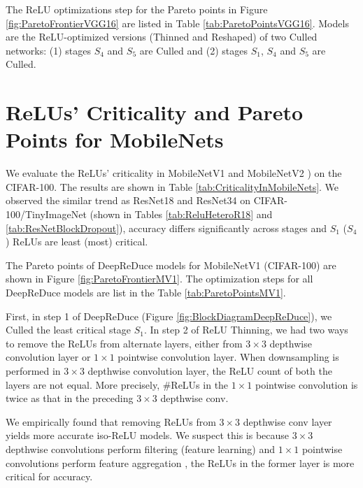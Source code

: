 

The ReLU optimizations step for the Pareto points in Figure \ref{fig:ParetoFrontierVGG16} are listed in Table \ref{tab:ParetoPointsVGG16}.  Models are the ReLU-optimized versions (Thinned and Reshaped) of two Culled networks: (1) stages $S_4$ and $S_5$ are Culled and (2) stages $S_1$, $S_4$ and $S_5$ are Culled. 





\section{ReLUs' Criticality and Pareto Points for MobileNets} \label{SecAppendix:ParetoPointsMV1}


We evaluate the ReLUs' criticality in MobileNetV1 \cite{howard2017mobilenets} and MobileNetV2 \cite{sandler2018mobilenetv2}) on the CIFAR-100. The results are shown in Table \ref{tab:CriticalityInMobileNets}.  We observed the similar trend as ResNet18 and ResNet34 on CIFAR-100/TinyImageNet (shown in Tables \ref{tab:ReluHeteroR18} and \ref{tab:ResNetBlockDropout}), accuracy differs significantly across stages and $S_1$ ($S_4$) ReLUs are least (most) critical.



The Pareto points of DeepReDuce models for MobileNetV1 (CIFAR-100) are shown in Figure \ref{fig:ParetoFrontierMV1}. The optimization steps for all DeepReDuce models are list in the Table \ref{tab:ParetoPointsMV1}. 


First, in step 1 of DeepReDuce (Figure \ref{fig:BlockDiagramDeepReDuce}), we Culled the least critical stage $S_1$. In step 2 of ReLU Thinning, we had two ways to remove the ReLUs from alternate layers, either from $3\times3$ depthwise convolution layer or $1\times1$ pointwise convolution layer. When downsampling is performed in $3\times3$ depthwise convolution layer, the ReLU count of both the layers are not equal. More precisely, \#ReLUs in the $1\times1$ pointwise convolution is twice as that in the preceding $3\times3$ depthwise conv. 


We empirically found that removing ReLUs from $3\times3$ depthwise conv layer yields more accurate iso-ReLU models. We suspect this is because $3\times 3$ depthwise convolutions perform filtering (feature learning) and $1\times1$ pointwise convolutions perform feature aggregation \cite{howard2017mobilenets}, the ReLUs in the former layer is more critical for accuracy. 


